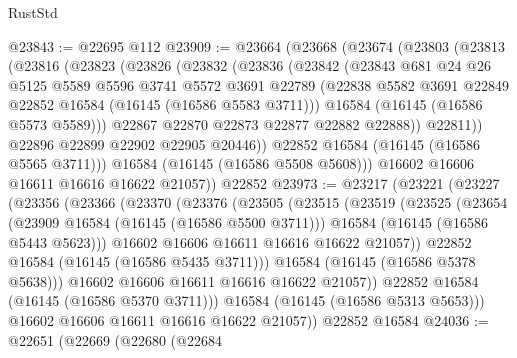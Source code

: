 \begin{lexlean}{RustStd}
\begin{coremodule}
@23843 := @22695 @112
@23909 := @23664
    (@23668
      (@23674
        (@23803
          (@23813
            (@23816
              (@23823
                (@23826
                  (@23832
                    (@23836
                      (@23842
                        (@23843
                          @681
                          @24
                          @26
                          @5125
                          @5589
                          @5596
                          @3741
                          @5572
                          @3691
                          @22789
                          (@22838 @5582 @3691 @22849 @22852 @16584 (@16145 (@16586 @5583 @3711)))
                          @16584
                          (@16145 (@16586 @5573 @5589)))
                        @22867
                        @22870
                        @22873
                        @22877
                        @22882
                        @22888))
                    @22811))
                @22896
                @22899
                @22902
                @22905
                @20446))
            @22852
            @16584
            (@16145 (@16586 @5565 @3711)))
          @16584
          (@16145 (@16586 @5508 @5608)))
        @16602
        @16606
        @16611
        @16616
        @16622
        @21057))
    @22852
@23973 := @23217
    (@23221
      (@23227
        (@23356
          (@23366
            (@23370
              (@23376
                (@23505
                  (@23515
                    (@23519
                      (@23525
                        (@23654
                          (@23909 @16584 (@16145 (@16586 @5500 @3711)))
                          @16584
                          (@16145 (@16586 @5443 @5623)))
                        @16602
                        @16606
                        @16611
                        @16616
                        @16622
                        @21057))
                    @22852
                    @16584
                    (@16145 (@16586 @5435 @3711)))
                  @16584
                  (@16145 (@16586 @5378 @5638)))
                @16602
                @16606
                @16611
                @16616
                @16622
                @21057))
            @22852
            @16584
            (@16145 (@16586 @5370 @3711)))
          @16584
          (@16145 (@16586 @5313 @5653)))
        @16602
        @16606
        @16611
        @16616
        @16622
        @21057))
    @22852
    @16584
@24036 := @22651
    (@22669
      (@22680
        (@22684

\end{coremodule}
\end{lexlean}
